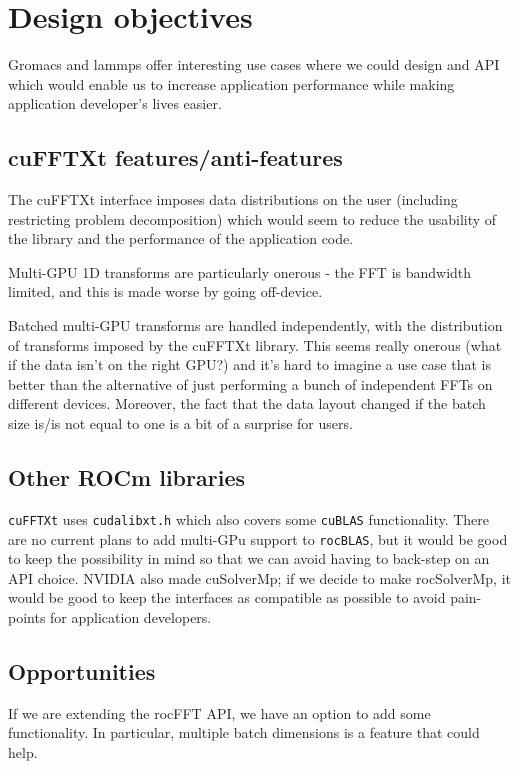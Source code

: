 \documentclass[12pt]{article}
\renewcommand{\(}{\left(}
\renewcommand{\)}{\right)}
\begin{document}
\section{Design objectives}

Gromacs and lammps offer interesting use cases where we could design
and API which would enable us to increase application performance
while making application developer's lives easier.

\subsection{cuFFTXt features/anti-features}
The cuFFTXt interface imposes data distributions on the user
(including restricting problem decomposition) which would seem to
reduce the usability of the library and the performance of the
application code.

Multi-GPU 1D transforms are particularly onerous - the FFT is
bandwidth limited, and this is made worse by going off-device.

Batched multi-GPU transforms are handled independently, with the
distribution of transforms imposed by the cuFFTXt library.  This seems
really onerous (what if the data isn't on the right GPU?) and it's
hard to imagine a use case that is better than the alternative of just
performing a bunch of independent FFTs on different devices.
Moreover, the fact that the data layout changed if the batch size
is/is not equal to one is a bit of a surprise for users.


\subsection{Other ROCm libraries}

\texttt{cuFFTXt} uses \lstinline{cudalibxt.h} which also covers some
\texttt{cuBLAS} functionality.  There are no current plans to add
multi-GPu support to \texttt{rocBLAS}, but it would be good to keep
the possibility in mind so that we can avoid having to back-step on an
API choice.  NVIDIA also made cuSolverMp; if we decide to make
rocSolverMp, it would be good to keep the interfaces as compatible as
possible to avoid pain-points for application developers.

\subsection{Opportunities}

If we are extending the rocFFT API, we have an option to add some
functionality.  In particular, multiple batch dimensions is a feature
that could help.
\end{document}
